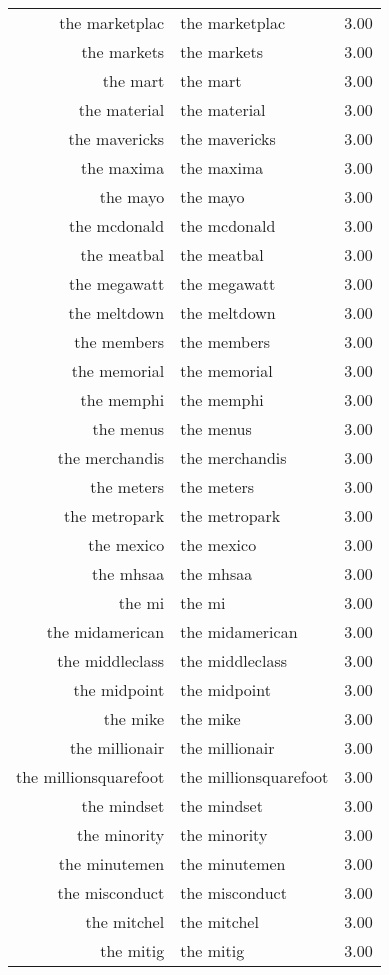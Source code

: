 \begin{table}[ht]
\begin{tabular}{rlr}
  the marketplac & the marketplac & 3.00 \\ 
  the markets & the markets & 3.00 \\ 
  the mart & the mart & 3.00 \\ 
  the material & the material & 3.00 \\ 
  the mavericks & the mavericks & 3.00 \\ 
  the maxima & the maxima & 3.00 \\ 
  the mayo & the mayo & 3.00 \\ 
  the mcdonald & the mcdonald & 3.00 \\ 
  the meatbal & the meatbal & 3.00 \\ 
  the megawatt & the megawatt & 3.00 \\ 
  the meltdown & the meltdown & 3.00 \\ 
  the members & the members & 3.00 \\ 
  the memorial & the memorial & 3.00 \\ 
  the memphi & the memphi & 3.00 \\ 
  the menus & the menus & 3.00 \\ 
  the merchandis & the merchandis & 3.00 \\ 
  the meters & the meters & 3.00 \\ 
  the metropark & the metropark & 3.00 \\ 
  the mexico & the mexico & 3.00 \\ 
  the mhsaa & the mhsaa & 3.00 \\ 
  the mi & the mi & 3.00 \\ 
  the midamerican & the midamerican & 3.00 \\ 
  the middleclass & the middleclass & 3.00 \\ 
  the midpoint & the midpoint & 3.00 \\ 
  the mike & the mike & 3.00 \\ 
  the millionair & the millionair & 3.00 \\ 
  the millionsquarefoot & the millionsquarefoot & 3.00 \\ 
  the mindset & the mindset & 3.00 \\ 
  the minority & the minority & 3.00 \\ 
  the minutemen & the minutemen & 3.00 \\ 
  the misconduct & the misconduct & 3.00 \\ 
  the mitchel & the mitchel & 3.00 \\ 
  the mitig & the mitig & 3.00 \\ 

\end{tabular}
\end{table}
